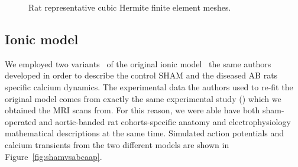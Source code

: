 \begin{figure}[!ht]
    \myfloatalign
    \quad
    \caption{Rat representative cubic Hermite finite element meshes.}
    \label{fig:ratrepgeom}
\end{figure}


%
%
%
\subsection{Ionic model}\label{sec:ch4ionicmodel}
We employed two variants~\cite{Gattoni:2017} of the original ionic model~\cite{Gattoni:2016} the same authors developed in order to describe the control SHAM and the diseased AB rats specific calcium dynamics. The experimental data the authors used to re-fit the original model comes from exactly the same experimental study (\cite{Roe:2017}) which we obtained the MRI scans from. For this reason, we were able have both sham-operated and aortic-banded rat cohorts-specific anatomy and electrophysiology mathematical descriptions at the same time. Simulated action potentials and calcium transients from the two different models are shown in Figure~\ref{fig:shamvsabcaap}.

